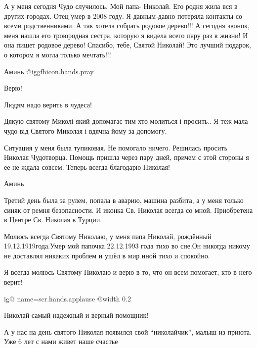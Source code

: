 \begin{itemize}

А у меня сегодня Чудо случилось. Мой папа- Николай. Его родня жила вся в других
городах. Отец умер в 2008 году. Я давным-давно потеряла контакты со всеми
родственниками. А так хотела собрать родовое дерево!!! А сегодня звонок, меня
нашла его троюродная сестра, которую я видела всего пару раз в жизни! И она
пишет родовое дерево! Спасибо, тебе, Святой Николай! Это лучший подарок, о
котором я могла только мечтать!!!


Аминь  @igg{fbicon.hands.pray} 

Верю!

Людям надо верить в чудеса!


Дякую святому Миколі який допомагає тим хто молиться і просить.. Я теж мала чудо
від Святого Миколая і вдячна йому за допомогу.


Ситуация у меня была тупиковая. Не помогало ничего. Решилась просить Николая
Чудотворца. Помощь пришла через пару дней, причем с этой стороны я ее не ждала
совсем. Теперь всегда благодарю Николая!

Аминь


Третий день была за рулем, попала в аварию, машина разбита, а у меня только
синяк от ремня безопасности. И иконка Св. Николая всегда со мной. Приобретена в
Центре Св. Николая в Турции.


Молюсь всегда Святому Николаю, у меня папа Николай, рождённый
19.12.1919года.Умер мой папочка 22.12.1993 года тихо во сне.Он никогда никому
не доставлял никаких проблем и ушёл в мир иной тихо и спокойно.

Я всегда молюсь Святому Николаю и верю в то, что он всем помогает, кто в него
верит!


\ifcmt
  ig@ name=scr.hands.applause
  @width 0.2
\fi

Николай самый надежный и верный помощник!


А у нас на день святого Николая появился свой \enquote{николайчик}, малыш из
приюта. Уже 6 лет с нами живет наше счастье


\end{itemize}
